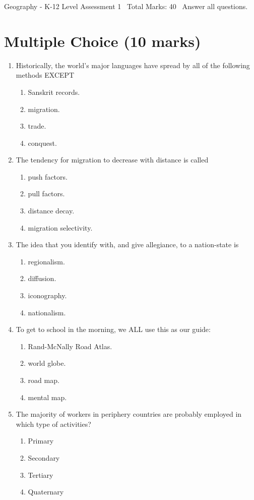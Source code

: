 \documentclass[12pt]{article}
\begin{document}
\begin{center}
Geography - K-12 Level Assessment 1 \
Total Marks: 40 \
Answer all questions.
\end{center}

\section*{Multiple Choice (10 marks)}
\begin{enumerate}[label=\arabic*.]
\item Historically, the world's major languages have spread by all of the following methods
EXCEPT
\begin{enumerate}[label=(\alph*)]
    \item Sanskrit records.
    \item migration.
    \item trade.
    \item conquest.
\end{enumerate}
\item The tendency for migration to decrease with distance is called
\begin{enumerate}[label=(\alph*)]
    \item push factors.
    \item pull factors.
    \item distance decay.
    \item migration selectivity.
\end{enumerate}
\item The idea that you identify with, and give allegiance, to a nation-state is
\begin{enumerate}[label=(\alph*)]
    \item regionalism.
    \item diffusion.
    \item iconography.
    \item nationalism.
\end{enumerate}
\item To get to school in the morning, we ALL use this as our guide:
\begin{enumerate}[label=(\alph*)]
    \item Rand-McNally Road Atlas.
    \item world globe.
    \item road map.
    \item mental map.
\end{enumerate}
\item The majority of workers in periphery countries are probably employed in which type of
activities?
\begin{enumerate}[label=(\alph*)]
    \item Primary
    \item Secondary
    \item Tertiary
    \item Quaternary
\end{enumerate}
\end{enumerate}
\end{document}
